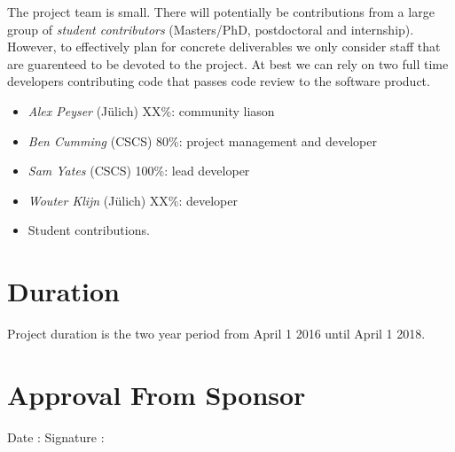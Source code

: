 \documentclass[11pt,a4paper]{article}
\newcommand{\julich}[0]{J\"ulich\xspace}
\begin{document}
The project team is small.
There will potentially be contributions from a large group of \emph{student contributors} (Masters/PhD, postdoctoral and internship).
However, to effectively plan for concrete deliverables we only consider staff that are guarenteed to be devoted to the project.
At best we can rely on two full time developers contributing code that passes code review to the software product.

\begin{itemize}
    \item \emph{Alex Peyser} (\julich) XX\%: community liason
    \item \emph{Ben Cumming} (CSCS) 80\%: project management and developer
    \item \emph{Sam Yates} (CSCS) 100\%: lead developer
    \item \emph{Wouter Klijn} (\julich) XX\%: developer
    \item Student contributions.
\end{itemize}

\section{Duration}
Project duration is the two year period from April 1 2016 until April 1 2018.

\section{Approval From Sponsor}
\vspace{20pt}
Date :\hspace{5cm} Signature :
\end{document}
